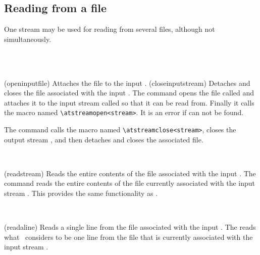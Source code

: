 {{{{\subsection{Reading from a file}


   One stream may be used for reading from several files, although not
simultaneously.

\begin{syntax}
\cmd{\openinputfile} \\
\cmd{\closeinputstream} \\
\end{syntax}
\glossary(openinputfile)%
  {}%
  {Attaches the file  to the input .}
\glossary(closeinputstream)%
  {}%
  {Detaches and closes the file associated with the input .}
The command \cmd{\openinputfile} opens the file 
called 
and attaches it to the input stream called 
 so that
it can be read from. Finally it calls the macro named 
\verb?\atstreamopen<stream>?.
It is an error if  can not be found.

    The command \cmd{\closeinputstream} calls the macro named
\verb?\atstreamclose<stream>?, closes the
output stream , and then detaches and closes 
the associated file.

\begin{syntax}
\cmd{\readstream} \\
\end{syntax}
\glossary(readstream)%
  {}%
  {Reads the entire contents of the file associated with the input .}
The command \cmd{\readstream} reads the entire contents of the file
currently associated with the input stream . This
provides the same functionality as \cmd{}.

\begin{syntax}
\cmd{\readaline} \\
\end{syntax}
\glossary(readaline)%
  {}%
  {Reads a single line from the file associated with the input .}
The \cmd{\readaline} reads what \tx\ 
considers to be one line from
the file that is currently associated with the input stream .

}}}}
